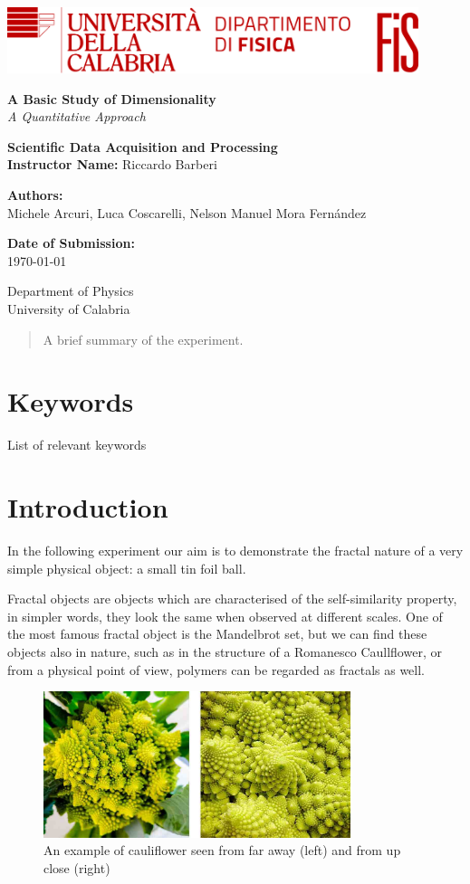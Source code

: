 \documentclass[a4paper,12pt]{article}
\newcommand{\customtitlepage}{
    

    \begin{titlepage}
        \includegraphics[width=0.9\textwidth]{logo.png}\\
        \centering
        \vspace*{1cm}
        
        \Huge\textbf{A Basic Study of Dimensionality}\\
        \vspace{0.5cm}
        \LARGE\textit{A Quantitative Approach}\\
        \vspace{1.5cm}
        
        \textbf{Scientific Data Acquisition and Processing} \\
        \textbf{Instructor Name:} Riccardo Barberi\\
        \vspace{0.5cm}
        
        \textbf{Authors:}\\
        \large Michele Arcuri, Luca Coscarelli, Nelson Manuel Mora Fernández\\
        \vfill
        
        \large \textbf{Date of Submission:}\\
        \today\\
        \vspace{1.5cm}
        
        \small
        Department of Physics \\
        University of Calabria\\
        \vspace{0.5cm}
    \end{titlepage}
}
\begin{document}
\customtitlepage

\begin{abstract}
    A brief summary of the experiment.
\end{abstract}


\section*{Keywords}
List of relevant keywords 

\newpage

\tableofcontents
\newpage

\section{Introduction}
In the following experiment our aim is to demonstrate the fractal nature 
of a very simple physical object: a small tin foil ball. 

Fractal objects are objects which are characterised of the self-similarity 
property, in simpler words, they look the same when observed at different scales.
One of the most famous fractal object is the Mandelbrot set, but we can find these 
objects also in nature, such as in the structure of a Romanesco Caullflower, or 
from a physical point of view, polymers can be regarded as fractals as well.

\begin{figure}[h]
    \centering
    \includegraphics[width = 0.8\textwidth]{Cauliflower.jpg}
    \caption{An example of cauliflower seen from far away (left) and from up close (right)}
    \label{fig:Cauliflower}
\end{figure}
\end{document}
